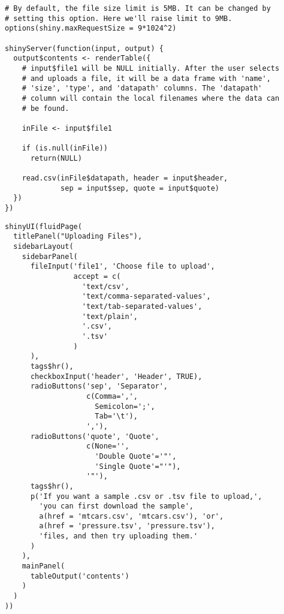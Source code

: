 \begin{framed}
\begin{verbatim}
# By default, the file size limit is 5MB. It can be changed by
# setting this option. Here we'll raise limit to 9MB.
options(shiny.maxRequestSize = 9*1024^2)

shinyServer(function(input, output) {
  output$contents <- renderTable({
    # input$file1 will be NULL initially. After the user selects
    # and uploads a file, it will be a data frame with 'name',
    # 'size', 'type', and 'datapath' columns. The 'datapath'
    # column will contain the local filenames where the data can
    # be found.

    inFile <- input$file1

    if (is.null(inFile))
      return(NULL)

    read.csv(inFile$datapath, header = input$header,
             sep = input$sep, quote = input$quote)
  })
})

\end{verbatim}
\end{framed}
\newpage
\begin{framed}
\begin{verbatim}
shinyUI(fluidPage(
  titlePanel("Uploading Files"),
  sidebarLayout(
    sidebarPanel(
      fileInput('file1', 'Choose file to upload',
                accept = c(
                  'text/csv',
                  'text/comma-separated-values',
                  'text/tab-separated-values',
                  'text/plain',
                  '.csv',
                  '.tsv'
                )
      ),
      tags$hr(),
      checkboxInput('header', 'Header', TRUE),
      radioButtons('sep', 'Separator',
                   c(Comma=',',
                     Semicolon=';',
                     Tab='\t'),
                   ','),
      radioButtons('quote', 'Quote',
                   c(None='',
                     'Double Quote'='"',
                     'Single Quote'="'"),
                   '"'),
      tags$hr(),
      p('If you want a sample .csv or .tsv file to upload,',
        'you can first download the sample',
        a(href = 'mtcars.csv', 'mtcars.csv'), 'or',
        a(href = 'pressure.tsv', 'pressure.tsv'),
        'files, and then try uploading them.'
      )
    ),
    mainPanel(
      tableOutput('contents')
    )
  )
))
\end{verbatim}
\end{framed}

